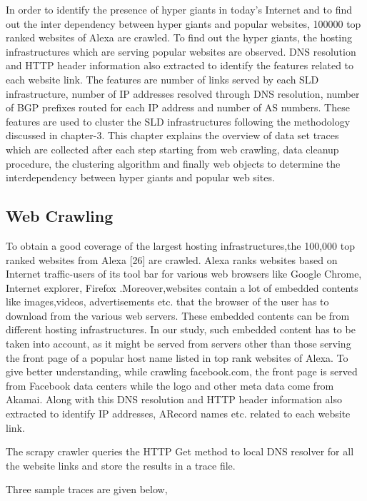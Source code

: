 In order to identify the presence of hyper giants in today's Internet and to find out the inter dependency between hyper giants and popular websites, 100000 top ranked websites of Alexa are crawled. To find out the hyper giants, the hosting infrastructures which are serving popular websites are observed. DNS resolution and HTTP header information also extracted to identify the features related to each website link. The features are number of links served by each SLD infrastructure, number of IP addresses resolved through DNS resolution, number of BGP prefixes routed for each IP address and number of AS numbers. These features are used to cluster the SLD infrastructures following the methodology discussed in chapter-3. This chapter explains the overview of data set traces which are collected after each step starting from web crawling, data cleanup procedure, the clustering algorithm and finally web objects to determine the interdependency between hyper giants and popular web sites.
\subsection{Web Crawling}
To obtain a good coverage of the largest hosting infrastructures,the 100,000 top ranked websites from Alexa [26] are crawled. Alexa ranks websites based on Internet traffic-users of its tool bar for various web browsers like Google Chrome, Internet explorer, Firefox .Moreover,websites contain a lot of embedded contents like images,videos, advertisements etc. that the browser of the user has to download from the various web servers. These embedded contents can be from different hosting infrastructures. In our study, such embedded content has to be taken into account, as it might be served from servers other than those serving the front page of a popular host name listed in top rank websites of Alexa. To give better understanding, while crawling facebook.com, the front page is served from Facebook data centers while the logo and other meta data come from Akamai. Along with this DNS resolution and HTTP header information also extracted to identify IP addresses, ARecord names etc. related to each website link.

The scrapy crawler queries the HTTP Get method to local DNS resolver for all the website links and store the results in a trace file. 

Three sample traces are given below,

\begin{center}
\end{center}

